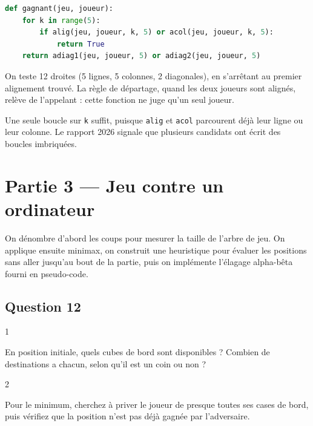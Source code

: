 \documentclass[11pt,a4paper]{article}
\begin{document}
\begin{lstlisting}[language=Python]
def gagnant(jeu, joueur):
    for k in range(5):
        if alig(jeu, joueur, k, 5) or acol(jeu, joueur, k, 5):
            return True
    return adiag1(jeu, joueur, 5) or adiag2(jeu, joueur, 5)
\end{lstlisting}

On teste 12 droites (5 lignes, 5 colonnes, 2 diagonales), en s'arrêtant au premier alignement trouvé. La règle de départage, quand les deux joueurs sont alignés, relève de l'appelant : cette fonction ne juge qu'un seul joueur.

\begin{piege}

Une seule boucle sur \texttt{k} suffit, puisque \texttt{alig} et \texttt{acol} parcourent déjà leur ligne ou leur colonne. Le rapport 2026 signale que plusieurs candidats ont écrit des boucles imbriquées.

\end{piege}

\hypertarget{partie-3-jeu-contre-un-ordinateur}{%
\section{Partie 3 --- Jeu contre un ordinateur}\label{partie-3-jeu-contre-un-ordinateur}}

On dénombre d'abord les coups pour mesurer la taille de l'arbre de jeu. On applique ensuite minimax, on construit une heuristique pour évaluer les positions sans aller jusqu'au bout de la partie, puis on implémente l'élagage alpha-bêta fourni en pseudo-code.

\hypertarget{question-12}{%
\subsection{Question 12}\label{question-12}}

\begin{indication}{1}

En position initiale, quels cubes de bord sont disponibles ? Combien de destinations a chacun, selon qu'il est un coin ou non ?

\end{indication}

\begin{indication}{2}

Pour le minimum, cherchez à priver le joueur de presque toutes ses cases de bord, puis vérifiez que la position n'est pas déjà gagnée par l'adversaire.

\end{indication}
\end{document}
